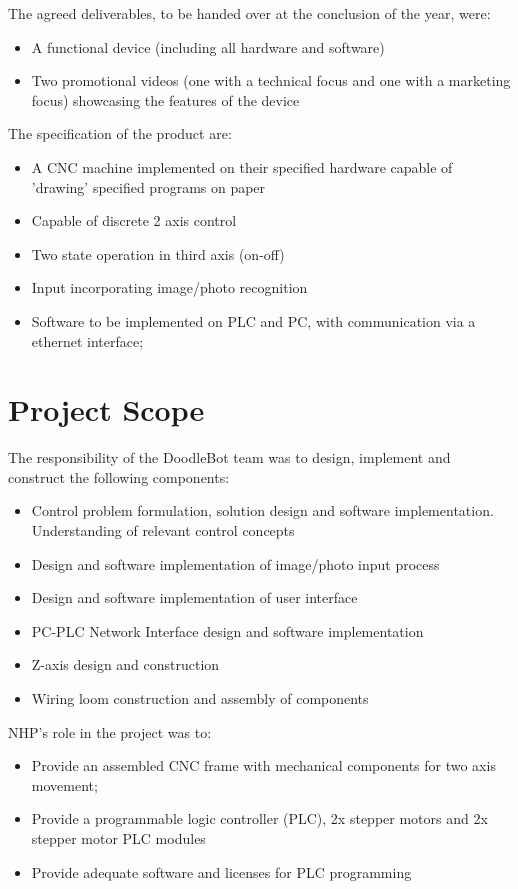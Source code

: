 The agreed deliverables, to be handed over at the conclusion of the year, were:
	\begin{itemize}
		\item A functional device (including all hardware and software)
		\item Two promotional videos (one with a technical focus and one with a marketing focus) showcasing the features of the device
	\end{itemize}	

The specification of the product are:
	\begin{itemize}
		\item A CNC machine implemented on their specified hardware capable of 'drawing' specified programs on paper
		\item Capable of discrete 2 axis control
		\item Two state operation in third axis (on-off)
		\item Input incorporating image/photo recognition
		\item Software to be implemented on PLC and PC, with communication via a ethernet interface;
	\end{itemize}

\section{Project Scope}
The responsibility of the DoodleBot team was to design, implement and construct the following components:
	\begin{itemize}
		\item Control problem formulation, solution design and software implementation. Understanding of relevant control concepts
		\item Design and software implementation of image/photo input process
		\item Design and software implementation of user interface
		\item PC-PLC Network Interface design and software implementation
		\item Z-axis design and construction
		\item Wiring loom construction and assembly of components
	\end{itemize}
	
NHP's role in the project was to:
	\begin{itemize}
		\item Provide an assembled CNC frame with mechanical components for two axis movement;
		\item Provide a programmable logic controller (PLC), 2x stepper motors and 2x stepper motor PLC modules
		\item Provide adequate software and licenses for PLC programming
	\end{itemize}



